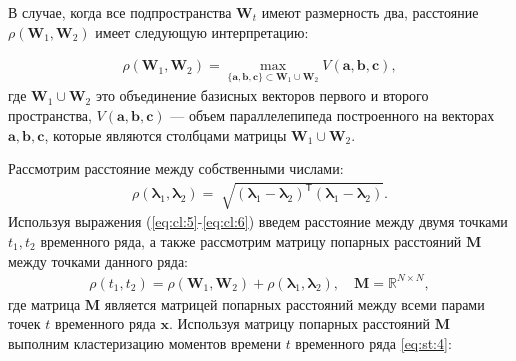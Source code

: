 В случае, когда все подпространства $\textbf{W}_t$ имеют размерность два, расстояние $\rho\left(\textbf{W}_1, \textbf{W}_2\right)$ имеет следующую интерпретацию:

\[
\label{eq:cl:5}
\begin{aligned}
\rho\left(\textbf{W}_1, \textbf{W}_2\right) = \max_{\{\textbf{a},\textbf{b},\textbf{c}\} \subset \textbf{W}_1\cup \textbf{W}_2 } V\left(\textbf{a},\textbf{b},\textbf{c}\right), 
\end{aligned}
\]
где $\textbf{W}_1\cup\textbf{W}_2$ это объединение базисных векторов первого и второго пространства, $V\left(\textbf{a},\textbf{b},\textbf{c}\right)$ --- объем параллелепипеда построенного на векторах $\textbf{a}, \textbf{b}, \textbf{c}$, которые являются столбцами матрицы $\textbf{W}_1\cup\textbf{W}_2$.


Рассмотрим расстояние между собственными числами:
\[
\label{eq:cl:6}
\begin{aligned}
\rho\left(\bm{\lambda}_1, \bm{\lambda}_2\right) = \sqrt[]{\left(\bm{\lambda}_1 - \bm{\lambda}_2\right)^{\mathsf{T}}\left(\bm{\lambda}_1 - \bm{\lambda}_2\right)}.
\end{aligned}
\]
Используя выражения (\ref{eq:cl:5}-\ref{eq:cl:6}) введем расстояние между двумя точками $t_1, t_2$ временного ряда, а также рассмотрим матрицу попарных расстояний $\textbf{M}$ между точками данного ряда:
\[
\label{eq:cl:9}
\begin{aligned}
\rho\left(t_1, t_2\right) = \rho\left(\textbf{W}_1, \textbf{W}_2\right) + \rho\left(\bm{\lambda}_1, \bm{\lambda}_2\right), \quad \textbf{M} =  \mathbb{R}^{N\times N},
\end{aligned}
\]
где %
матрица $\textbf{M}$ является матрицей попарных расстояний между всеми парами точек $t$ временного ряда $\textbf{x}$.
Используя матрицу попарных расстояний $\textbf{M}$ выполним кластеризацию моментов времени $t$ временного ряда \eqref{eq:st:4}:

